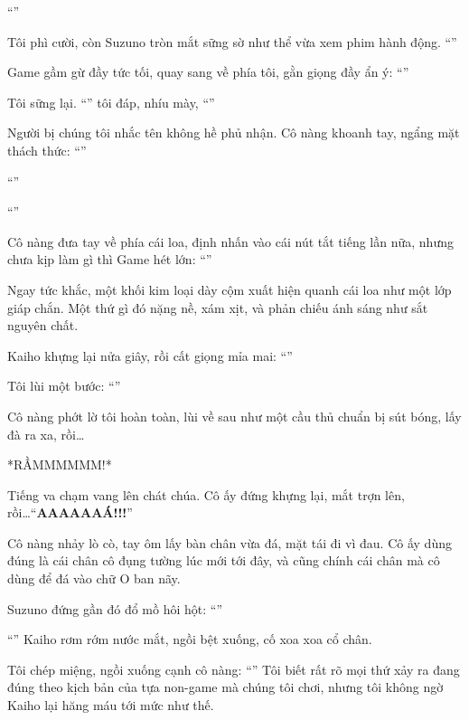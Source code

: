 \documentclass[../main.tex]{subfiles}
\begin{document}
``''

Tôi phì cười, còn Suzuno tròn mắt sững sờ như thể vừa xem phim hành động. ``''

Game gầm gừ đầy tức tối, quay sang về phía tôi, gằn giọng đầy ẩn ý: ``''

Tôi sững lại. ``'' tôi đáp, nhíu mày, ``''

Người bị chúng tôi nhắc tên không hề phủ nhận. Cô nàng khoanh tay, ngẩng mặt thách thức: ``''

``''

``''

Cô nàng đưa tay về phía cái loa, định nhấn vào cái nút tắt tiếng lần nữa, nhưng chưa kịp làm gì thì Game hét lớn: ``''

Ngay tức khắc, một khối kim loại dày cộm xuất hiện quanh cái loa như một lớp giáp chắn. Một thứ gì đó nặng nề, xám xịt, và phản chiếu ánh sáng như sắt nguyên chất.

Kaiho khựng lại nửa giây, rồi cất giọng mỉa mai: ``''

Tôi lùi một bước: ``''

Cô nàng phớt lờ tôi hoàn toàn, lùi về sau như một cầu thủ chuẩn bị sút bóng, lấy đà ra xa, rồi\dots

*RẦMMMMMM!*

Tiếng va chạm vang lên chát chúa. Cô ấy đứng khựng lại, mắt trợn lên, rồi\dots ``\textbf{AAAAAAÁ!!!}''

Cô nàng nhảy lò cò, tay ôm lấy bàn chân vừa đá, mặt tái đi vì đau. Cô ấy dùng đúng là cái chân cô đụng tường lúc mới tới đây, và cũng chính cái chân mà cô dùng để đá vào chữ O ban nãy.

Suzuno đứng gần đó đổ mồ hôi hột: ``''

``'' Kaiho rơm rớm nước mắt, ngồi bệt xuống, cố xoa xoa cổ chân.

Tôi chép miệng, ngồi xuống cạnh cô nàng: ``'' Tôi biết rất rõ mọi thứ xảy ra đang đúng theo kịch bản của tựa non-game mà chúng tôi chơi, nhưng tôi không ngờ Kaiho lại hăng máu tới mức như thế.
\end{document}
